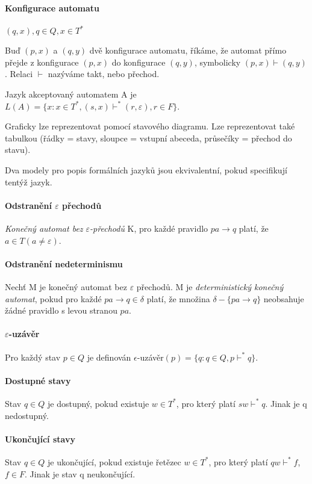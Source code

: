 \documentclass[a4wide]{report}
\begin{document}
\paragraph{Konfigurace automatu}
 $(q,x), q \in Q, x \in T^*$

Buď $(p,x)$ a $(q,y)$ dvě konfigurace automatu, říkáme, že automat přímo přejde z konfigurace $(p,x)$ do konfigurace $(q,y)$, symbolicky $(p,x) \vdash (q,y)$. Relaci $\vdash$ nazýváme takt, nebo přechod.

Jazyk akceptovaný automatem A je $L(A) = \{x: x \in T^*, (s,x) \vdash^* (r, \varepsilon), r \in F\}$.

Graficky lze reprezentovat pomocí stavového diagramu. Lze reprezentovat také tabulkou (řádky = stavy, sloupce = vstupní abeceda, průsečíky = přechod do stavu).

Dva modely pro popis formálních jazyků jsou ekvivalentní, pokud specifikují tentýž jazyk.

\paragraph{Odstranění $\varepsilon$ přechodů}
\emph{Konečný automat bez $\varepsilon$-přechodů} K, pro každé pravidlo $pa \to q$ platí, že $a \in T (a \neq \varepsilon)$.

\paragraph{Odstranění nedeterminismu}
Nechť M je konečný automat bez $\varepsilon$ přechodů. M je \emph{deterministický konečný automat}, pokud pro každé $pa \to q \in \delta$ platí, že množina $\delta - \{pa \to q\}$ neobsahuje žádné pravidlo s levou stranou $pa$.

\paragraph{$\varepsilon$-uzávěr}
Pro každý stav $p \in Q$ je definován $\epsilon$-uzávěr$(p) = \{ q: q \in Q, p \vdash^* q\}$.

\paragraph{Dostupné stavy}
Stav $q \in Q$ je dostupný, pokud existuje $w \in T^*$, pro který platí $sw \vdash^* q$. Jinak je q nedostupný.

\paragraph{Ukončující stavy}
Stav $q \in Q$ je ukončující, pokud existuje řetězec $w \in T^*$, pro který platí $qw \vdash^* f$, $f \in F$. Jinak je stav q neukončující. 
\end{document}

